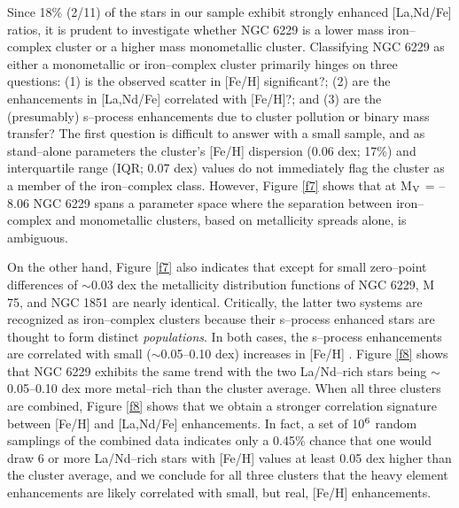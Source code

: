 \documentclass[12pt,preprint]{emulateapj}
\begin{document}
Since 18$\%$ (2/11) of the stars in our sample exhibit strongly enhanced
[La,Nd/Fe] ratios, it is prudent to investigate whether NGC 6229 is a lower
mass iron--complex cluster or a higher mass monometallic cluster.  Classifying
NGC 6229 as either a monometallic or iron--complex cluster primarily hinges on
three questions: (1) is the observed scatter in [Fe/H] significant?; (2) are
the enhancements in [La,Nd/Fe] correlated with [Fe/H]?; and (3) are the 
(presumably) s--process enhancements due to cluster pollution or binary mass 
transfer?  The first question is difficult to answer with a small sample, and
as stand--alone parameters the cluster's [Fe/H] dispersion (0.06 dex; 17$\%$) 
and interquartile range (IQR; 0.07 dex) values do not immediately flag the 
cluster as a member of the iron--complex class.  However, Figure \ref{f7} shows
that at M$_{\rm V}$ = --8.06 NGC 6229 spans a parameter space where the 
separation between iron--complex and monometallic clusters, based on 
metallicity spreads alone, is ambiguous.  

On the other hand, Figure \ref{f7} also indicates that except for small 
zero--point differences of $\sim$0.03 dex the metallicity distribution 
functions of NGC 6229, M 75, and NGC 1851 are nearly identical.  Critically, 
the latter two systems are recognized as iron--complex clusters 
\citep[][]{Marino15,DaCosta16} because their s--process enhanced stars are 
thought to form distinct \emph{populations}.  In both cases, the s--process
enhancements are correlated with small ($\sim$0.05--0.10 dex) increases in 
[Fe/H] \citep{Carretta11,Kacharov13}.  Figure \ref{f8} shows that NGC 6229
exhibits the same trend with the two La/Nd--rich stars being $\sim$0.05--0.10
dex more metal--rich than the cluster average.  When all three clusters are 
combined, Figure \ref{f8} shows that we obtain a stronger correlation
signature between [Fe/H] and [La,Nd/Fe] enhancements.  In fact, a set of 
10$^{\rm 6}$ random samplings of the combined data indicates only a 0.45$\%$ 
chance that one would draw 6 or more La/Nd--rich stars with [Fe/H] values at 
least 0.05 dex higher than the cluster average, and we conclude for all three 
clusters that the heavy element enhancements are likely correlated with small,
but real, [Fe/H] enhancements.
\end{document}
